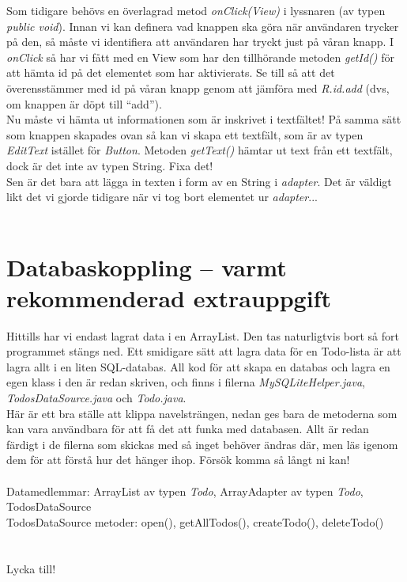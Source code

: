 \documentclass[11 pt, titlepage]{article} %
\begin{document}
Som tidigare behövs en överlagrad metod \textit{onClick(View)} i lyssnaren (av typen \textit{public void}). Innan vi kan definera vad knappen ska göra när användaren trycker på den, så måste vi identifiera att användaren har tryckt just på våran knapp.
I \textit{onClick} så har vi fått med en View som har den tillhörande metoden \textit{getId()} för att hämta id på det elementet som har aktivierats.
Se till så att det överensstämmer med id på våran knapp genom att jämföra med \textit{R.id.add} (dvs, om knappen är döpt till ``add'').\\

Nu måste vi hämta ut informationen som är inskrivet i textfältet! På samma sätt som knappen skapades ovan så kan vi skapa ett textfält, som är av typen \textit{EditText} istället för \textit{Button}.
Metoden \textit{getText()} hämtar ut text från ett textfält, dock är det inte av typen String. Fixa det!\\

Sen är det bara att lägga in texten i form av en String i \textit{adapter}. Det är väldigt likt det vi gjorde tidigare när vi tog bort elementet ur \textit{adapter}...\\ \\
\section{Databaskoppling – varmt rekommenderad extrauppgift}
Hittills har vi endast lagrat data i en ArrayList.
Den tas naturligtvis bort så fort programmet stängs ned.
Ett smidigare sätt att lagra data för en Todo-lista är att lagra allt i en liten SQL-databas.
All kod för att skapa en databas och lagra en egen klass i den är redan skriven, och finns i filerna \textit{MySQLiteHelper.java}, \textit{TodosDataSource.java} och \textit{Todo.java}.\\

Här är ett bra ställe att klippa navelsträngen, nedan ges bara de metoderna som kan vara användbara för att få det att funka med databasen.
Allt är redan färdigt i de filerna som skickas med så inget behöver ändras där, men läs igenom dem för att förstå hur det hänger ihop.
Försök komma så långt ni kan!\\ \\

Datamedlemmar: ArrayList av typen \textit{Todo}, ArrayAdapter av typen \textit{Todo}, TodosDataSource \\
TodosDataSource metoder: open(), getAllTodos(), createTodo(), deleteTodo() \\

\\ \\

Lycka till!
\end{document}
